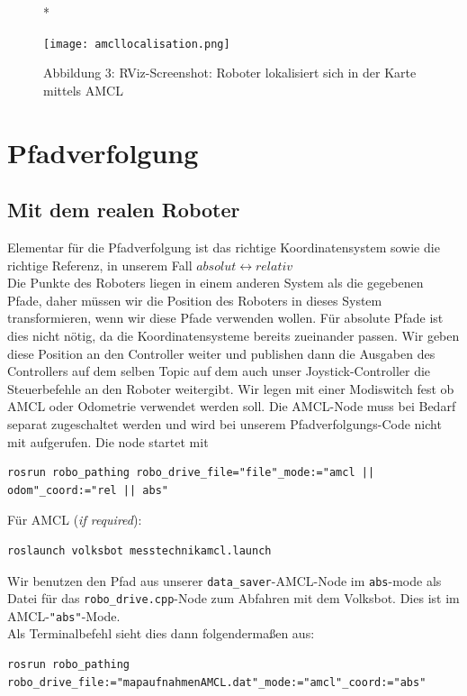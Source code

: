 \documentclass[11pt,a4paper]{article}
\begin{document}
\begin{figure}[H]
*  \caption*{Abbildung 3: RViz-Screenshot: Roboter lokalisiert sich in der Karte mittels AMCL}
  \texttt{[image: amcllocalisation.png]}
  \centering
\end{figure}

\section{Pfadverfolgung}
\subsection*{Mit dem realen Roboter}
Elementar für die Pfadverfolgung ist das richtige Koordinatensystem sowie die richtige Referenz, in unserem Fall $absolut \leftrightarrow relativ$ \\
Die Punkte des Roboters liegen in einem anderen System als die gegebenen Pfade, daher müssen
wir die Position des Roboters in dieses System transformieren, wenn wir diese Pfade verwenden wollen. 
Für absolute Pfade ist dies nicht nötig, da die Koordinatensysteme bereits zueinander passen. 
Wir geben diese Position an den Controller weiter und publishen dann die Ausgaben des Controllers auf dem 
selben Topic auf dem auch unser Joystick-Controller die Steuerbefehle an den Roboter weitergibt. 
Wir legen mit einer Modiswitch fest ob AMCL oder Odometrie verwendet werden soll. Die AMCL-Node muss 
bei Bedarf separat zugeschaltet werden und wird bei unserem Pfadverfolgungs-Code nicht mit aufgerufen.
Die node startet mit \begin{verbatim}
rosrun robo_pathing robo_drive_file="file"_mode:="amcl || odom"_coord:="rel || abs"
\end{verbatim}
Für AMCL (\textit{if required}):
\begin{verbatim}
roslaunch volksbot messtechnikamcl.launch
\end{verbatim}
Wir benutzen den Pfad aus unserer \verb|data_saver|-AMCL-Node im \texttt{abs}-mode als Datei
für das \verb|robo_drive.cpp|-Node zum Abfahren mit dem Volksbot. Dies ist im AMCL-\texttt{"abs"}-Mode. \\
Als Terminalbefehl sieht dies dann folgendermaßen aus:
\begin{verbatim}
rosrun robo_pathing robo_drive_file:="mapaufnahmenAMCL.dat"_mode:="amcl"_coord:="abs"
\end{verbatim}
\end{document}

